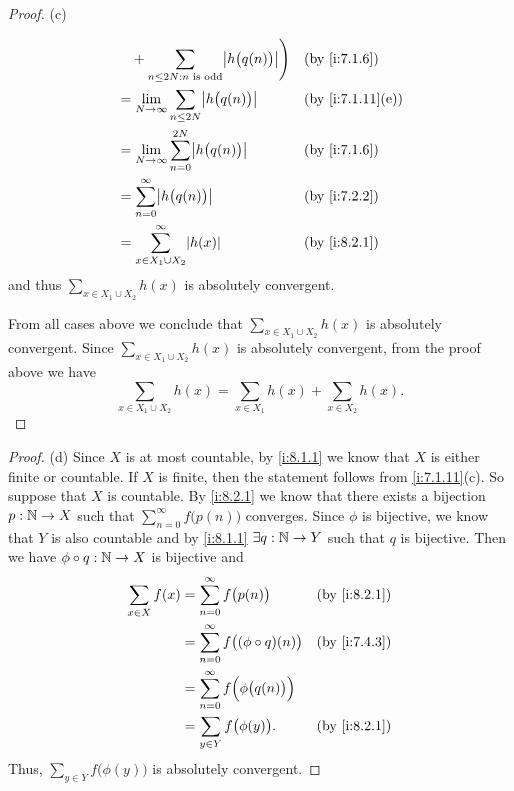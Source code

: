 \begin{proof}{(c)}
\begin{itemize}
\begin{align*}
             & \quad + \sum_{n \leq 2N : n \text{ is odd}} \abs{h\big(q(n)\big)}\Bigg)                                             &  & \by{i:7.1.6}     \\
             & = \lim_{N \to \infty} \sum_{n \leq 2N} \abs{h\big(q(n)\big)}                                                        &  & \by{i:7.1.11}[e] \\
             & = \lim_{N \to \infty} \sum_{n = 0}^{2N} \abs{h\big(q(n)\big)}                                                       &  & \by{i:7.1.6}     \\
             & = \sum_{n = 0}^\infty \abs{h\big(q(n)\big)}                                                                         &  & \by{i:7.2.2}     \\
             & = \sum_{x \in X_1 \cup X_2}^\infty \abs{h(x)}                                                                       &  & \by{i:8.2.1}
          \end{align*}
          and thus \(\sum_{x \in X_1 \cup X_2} h(x)\) is absolutely convergent.
  \end{itemize}
  From all cases above we conclude that \(\sum_{x \in X_1 \cup X_2} h(x)\) is absolutely convergent.
  Since \(\sum_{x \in X_1 \cup X_2} h(x)\) is absolutely convergent, from the proof above we have
  \[
    \sum_{x \in X_1 \cup X_2} h(x) = \sum_{x \in X_1} h(x) + \sum_{x \in X_2} h(x).
  \]
\end{proof}

\begin{proof}{(d)}
  Since \(X\) is at most countable, by \cref{i:8.1.1} we know that \(X\) is either finite or countable.
  If \(X\) is finite, then the statement follows from \cref{i:7.1.11}(c).
  So suppose that \(X\) is countable.
  By \cref{i:8.2.1} we know that there exists a bijection \(p : \mathbb{N} \to X\) such that \(\sum_{n = 0}^\infty f\big(p(n)\big)\) converges.
  Since \(\phi\) is bijective, we know that \(Y\) is also countable and by \cref{i:8.1.1} \(\exists q : \mathbb{N} \to Y\) such that \(q\) is bijective.
  Then we have \(\phi \circ q : \mathbb{N} \to X\) is bijective and
  \begin{align*}
    \sum_{x \in X} f(x) & = \sum_{n = 0}^\infty f\big(p(n)\big)               &  & \by{i:8.2.1} \\
                        & = \sum_{n = 0}^\infty f\big((\phi \circ q)(n)\big)  &  & \by{i:7.4.3} \\
                        & = \sum_{n = 0}^\infty f\Big(\phi\big(q(n)\big)\Big)                   \\
                        & = \sum_{y \in Y} f\big(\phi(y)\big).                &  & \by{i:8.2.1}
  \end{align*}
  Thus, \(\sum_{y \in Y} f\big(\phi(y)\big)\) is absolutely convergent.
\end{proof}

